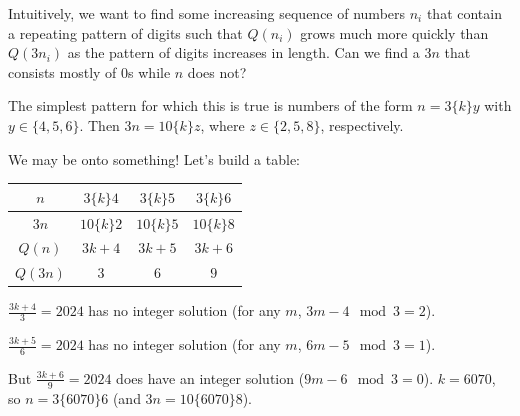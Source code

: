 \documentclass[11pt, oneside]{amsart}
\begin{document}
Intuitively, we want to find some increasing sequence of numbers $n_i$ that contain a repeating pattern of digits
such that $Q(n_i)$ grows much more quickly than $Q(3n_i)$ as the pattern of digits increases in length.
Can we find a $3n$ that consists mostly of 0s while $n$ does not?

The simplest pattern for which this is true is numbers of the form $n = 3\{k\}y$ with $y \in \{ 4, 5, 6 \}$. Then
$3n = 10\{k\}z$, where $z \in \{ 2, 5, 8 \}$, respectively.

We may be onto something! Let's build a table:

\begin{table}[h!]
\centering
\begin{tabular}{|c|c|c|c|}
	\hline
	$n$      & $3\{k\}4$    & $3\{k\}5$    & $3\{k\}6$ \\
	\hline
	$3n$     & $10\{k\}2$   & $10\{k\}5$   & $10\{k\}8$ \\
	\hline
	$Q(n)$   & $3k+4$       & $3k+5$       & $3k+6$ \\
	\hline
	$Q(3n)$  & $3$          & $6$          & $9$ \\
	\hline
\end{tabular}
\end{table}

$\frac{3k+4}{3} = 2024$ has no integer solution (for any $m$, $3m-4 \mod 3 = 2$).

$\frac{3k+5}{6} = 2024$ has no integer solution (for any $m$, $6m-5 \mod 3 = 1$).

But $\frac{3k+6}{9} = 2024$ does have an integer solution ($9m-6 \mod 3 = 0$). $k = 6070$,
so $n = 3\{6070\}6$ (and $3n = 10\{6070\}8$).
\end{document}
